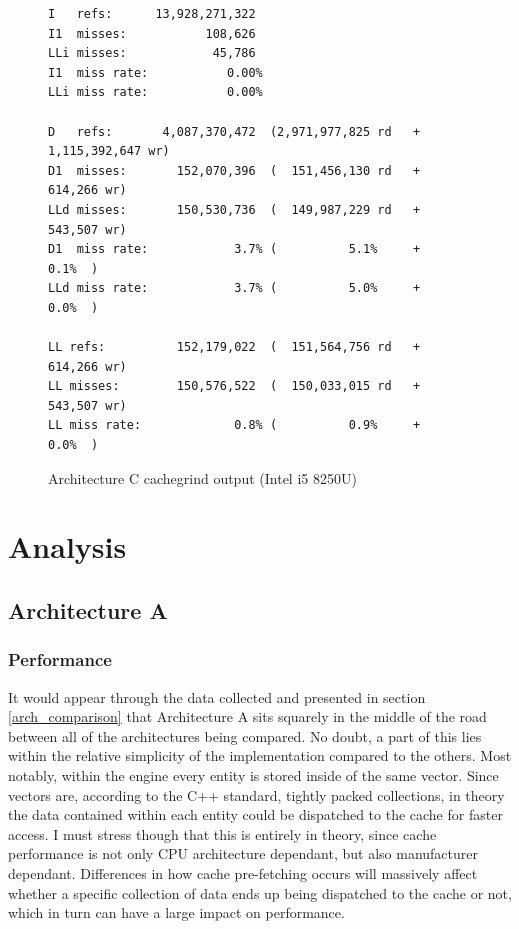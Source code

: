 \documentclass{article}
\begin{document}
\begin{figure}[!h]
\centering
\begin{BVerbatim}
I   refs:      13,928,271,322
I1  misses:           108,626
LLi misses:            45,786
I1  miss rate:           0.00%
LLi miss rate:           0.00%

D   refs:       4,087,370,472  (2,971,977,825 rd   + 1,115,392,647 wr)
D1  misses:       152,070,396  (  151,456,130 rd   +       614,266 wr)
LLd misses:       150,530,736  (  149,987,229 rd   +       543,507 wr)
D1  miss rate:            3.7% (          5.1%     +           0.1%  )
LLd miss rate:            3.7% (          5.0%     +           0.0%  )

LL refs:          152,179,022  (  151,564,756 rd   +       614,266 wr)
LL misses:        150,576,522  (  150,033,015 rd   +       543,507 wr)
LL miss rate:             0.8% (          0.9%     +           0.0%  )
\end{BVerbatim}
\caption{Architecture C cachegrind output (Intel i5 8250U)}
\label{arch_c_cachegrind_laptop}
\end{figure}

\clearpage

\section{Analysis}
\subsection{Architecture A}
\subsubsection{Performance}
It would appear through the data collected and presented in section
\ref{arch_comparison} that Architecture A sits squarely in the middle of the
road between all of the architectures being compared. No doubt, a part of this
lies within the relative simplicity of the implementation compared to the
others. Most notably, within the engine every entity is stored inside of the
same vector. Since vectors are, according to the C++ standard, tightly packed
collections, in theory the data contained within each entity could be dispatched
to the cache for faster access. I must stress though that this is entirely in
theory, since cache performance is not only CPU architecture dependant, but also
manufacturer dependant. Differences in how cache pre-fetching occurs will
massively affect whether a specific collection of data ends up being dispatched
to the cache or not, which in turn can have a large impact on performance.
\end{document}
